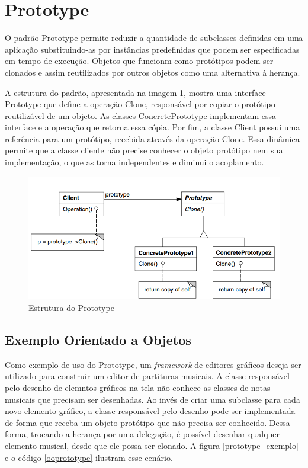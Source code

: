 \section{Prototype}

O padrão Prototype permite reduzir a quantidade 
de subclasses definidas em uma aplicação 
substituindo-as por instâncias predefinidas 
que podem ser especificadas em tempo de 
execução. Objetos que funcionm como 
protótipos podem ser clonados e assim 
reutilizados por outros objetos como uma 
alternativa à herança. 

A estrutura do padrão, apresentada na imagem 
\ref{prototype_struct}, mostra uma interface 
Prototype que define a operação Clone, responsável 
por copiar o protótipo reutilizável de um objeto. 
As classes ConcretePrototype implementam essa 
interface e a operação que retorna essa cópia. 
Por fim, a classe Client possui uma referência 
para um protótipo, recebida através da operação 
Clone. Essa dinâmica permite que a classe cliente 
não precise conhecer o objeto protótipo nem sua 
implementação, o que as torna independentes e 
diminui o acoplamento.

\begin{figure}[htb]
	\caption{\label{prototype_struct}Estrutura do Prototype}
	\begin{center}
	    \includegraphics[scale=0.5]{5_padroes-contexto-funcional/5.1_criacionais/5.1.4_prototype/diagram.png}
	\end{center}
\end{figure}


\subsection*{Exemplo Orientado a Objetos}

Como exemplo de uso do Prototype, um 
\textit{framework} de editores gráficos deseja 
ser utilizado para construir um editor de 
partituras musicais. A classe responsável pelo 
desenho de elemntos gráficos na tela não 
conhece as classes de notas musicais que 
precisam ser desenhadas. Ao invés de criar uma 
subclasse para cada novo elemento gráfico, 
a classe responsável pelo desenho 
pode ser implementada de forma que receba 
um objeto protótipo que não precisa ser 
conhecido. Dessa forma, trocando a herança 
por uma delegação, é possível desenhar qualquer 
elemento musical, desde que ele possa ser 
clonado. A figura \ref{prototype_exemplo} e 
o código \ref{ooprototype} ilustram esse cenário.

